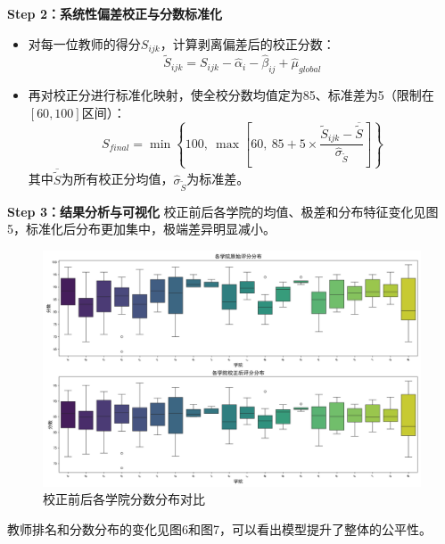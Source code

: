 \documentclass[withoutpreface,bwprint]{cumcmthesis}
\begin{document}
\textbf{Step 2：系统性偏差校正与分数标准化}
\begin{itemize}
    \item 对每一位教师的得分$S_{ijk}$，计算剥离偏差后的校正分数：
    $$
    \widetilde{S}_{ijk} = S_{ijk} - \widehat{\alpha}_i - \widehat{\beta}_{ij} + \widehat{\mu}_{global}
    $$
    \item 再对校正分进行标准化映射，使全校分数均值定为85、标准差为5（限制在$[60,100]$区间）：
    $$
    S_{final} = \min \left\{100,\ \max\left[60,\ 85 + 5 \times \frac{\widetilde{S}_{ijk} - \overline{\widetilde{S}}}{\widehat{\sigma}_{\widetilde{S}}}\right]\right\}
    $$
    其中$\overline{\widetilde{S}}$为所有校正分均值，$\widehat{\sigma}_{\widetilde{S}}$为标准差。
\end{itemize}

\textbf{Step 3：结果分析与可视化}
校正前后各学院的均值、极差和分布特征变化见图5，标准化后分布更加集中，极端差异明显减小。

\begin{figure}[H]
\centering
\includegraphics[width=1\textwidth]{figures/Results_Visualization/college_scores_comparison.png}
\caption{校正前后各学院分数分布对比}
\label{fig:college_scores_comparison}
\end{figure}

教师排名和分数分布的变化见图6和图7，可以看出模型提升了整体的公平性。
\end{document}
